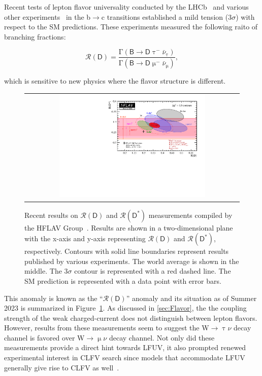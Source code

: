 Recent tests of lepton flavor universality conducted by the \ac{LHCb}~\cite{LHCb:2023zxo} and various other experiments~\cite{HFLAV} in the b$\rightarrow$c transitions established a mild tension (3$\sigma$) with respect to the \ac{SM} predictions. These experiments measured the following raito of branching fractions:

\begin{equation}
\mathcal{R}(\textsf{D})=\frac{\mathrm{\Gamma}(\textsf{B}\rightarrow\textsf{D}\uptau^{-}\bar{\nu}_{\uptau})}{\mathrm{\Gamma}(\textsf{B}\rightarrow\textsf{D}\upmu^{-}\bar{\nu}_{\upmu})},
\end{equation}

which is sensitive to new physics where the flavor structure is different.

\begin{figure}[tbh!]
 \begin{center}
 \begin{tabular}{c}
 \includegraphics[width=0.7\textwidth]{figures/Part1/BSM/RD}
 \end{tabular}
 \caption{Recent results on $\mathcal{R}(\textsf{D})$ and $\mathcal{R}(\textsf{D}^{*})$ measurements compiled by the HFLAV Group~\cite{HFLAV}. Results are shown in a two-dimensional plane with the x-axis and y-axis representing $\mathcal{R}(\textsf{D})$ and $\mathcal{R}(\textsf{D}^{*})$, respectively. Contours with solid line boundaries represent results published by various experiments. The world average is shown in the middle. The 3$\sigma$ contour is represented with a red dashed line. The \ac{SM} prediction is represented with a data point with error bars.}
 \label{fig:RD}
 \end{center}
\end{figure}

This anomaly is known as the ``$\mathcal{R}(\textsf{D})$'' anomaly and its situation as of Summer 2023 is summarized in Figure~\ref{fig:RD}. As discussed in \autoref{sec:Flavor}, the the coupling strength of the weak charged-current does not distinguish between lepton flavors. However, results from these measurements seem to suggest the W$\rightarrow\uptau\nu$ decay channel is favored over W$\rightarrow\upmu\nu$ decay channel. Not only did these measurements provide a direct hint towards \ac{LFUV}, it also prompted renewed experimental interest in \ac{CLFV} search since models that accommodate \ac{LFUV} generally give rise to \ac{CLFV} as well~\cite{Glashow:2014iga}. 


